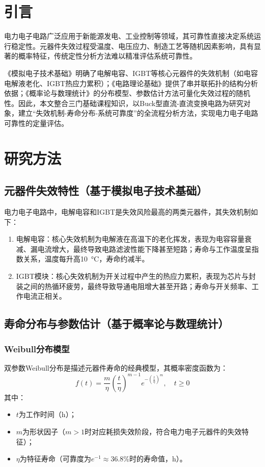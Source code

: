 \documentclass[12pt]{article}
\begin{document}
\section{引言}
电力电子电路广泛应用于新能源发电、工业控制等领域，其可靠性直接决定系统运行稳定性。元器件失效过程受温度、电压应力、制造工艺等随机因素影响，具有显著的概率特征，传统定性分析方法难以精准评估系统可靠性。

《模拟电子技术基础》明确了电解电容、IGBT等核心元器件的失效机制（如电容电解液老化、IGBT热应力累积）；《电路理论基础》提供了串并联拓扑的结构分析依据；《概率论与数理统计》的分布模型、参数估计方法可量化失效过程的随机性。因此，本文整合三门基础课程知识，以Buck型直流-直流变换电路为研究对象，建立“失效机制-寿命分布-系统可靠度”的全流程分析方法，实现电力电子电路可靠性的定量评估。

\section{研究方法}
\subsection{元器件失效特性（基于模拟电子技术基础）}
电力电子电路中，电解电容和IGBT是失效风险最高的两类元器件，其失效机制如下：
\begin{enumerate}
    \item 电解电容：核心失效机制为电解液在高温下的老化挥发，表现为电容容量衰减、漏电流增大，最终导致电路滤波性能下降甚至短路；寿命与工作温度呈指数关系，温度每升高\SI{10}{\celsius}，寿命约减半。
    \item IGBT模块：核心失效机制为开关过程中产生的热应力累积，表现为芯片与封装之间的热循环疲劳，最终导致导通电阻增大甚至开路；寿命与开关频率、工作电流正相关。
\end{enumerate}

\subsection{寿命分布与参数估计（基于概率论与数理统计）}
\subsubsection{Weibull分布模型}
双参数Weibull分布是描述元器件寿命的经典模型，其概率密度函数为：
\begin{equation}\label{eq:weibull_pdf}
f(t) = \frac{m}{\eta} \left( \frac{t}{\eta} \right)^{m-1} e^{-\left( \frac{t}{\eta} \right)^m}, \quad t \geq 0
\end{equation}
其中：
\begin{itemize}
    \item $t$为工作时间（\si{\hour}）；
    \item $m$为形状因子（$m>1$时对应耗损失效阶段，符合电力电子元器件的失效特征）；
    \item $\eta$为特征寿命（可靠度为$e^{-1}\approx36.8\%$时的寿命值，\si{\hour}）。
\end{itemize}
\end{document}
